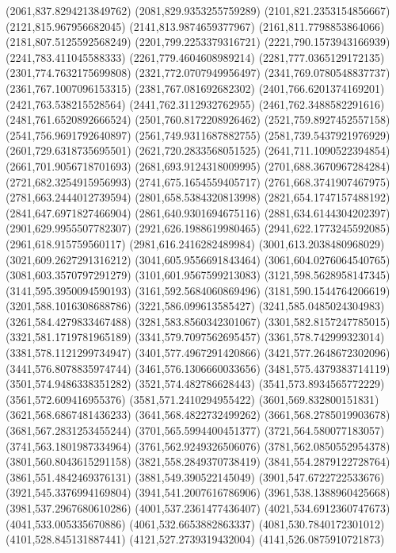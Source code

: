 {(2061,837.8294213849762)
(2081,829.9353255759289)
(2101,821.2353154856667)
(2121,815.967956682045)
(2141,813.9874659377967)
(2161,811.7798853864066)
(2181,807.5125592568249)
(2201,799.2253379316721)
(2221,790.1573943166939)
(2241,783.411045588333)
(2261,779.4604608989214)
(2281,777.0365129172135)
(2301,774.7632175699808)
(2321,772.0707949956497)
(2341,769.0780548837737)
(2361,767.1007096153315)
(2381,767.081692682302)
(2401,766.6201374169201)
(2421,763.538215528564)
(2441,762.3112932762955)
(2461,762.3488582291616)
(2481,761.6520892666524)
(2501,760.8172208926462)
(2521,759.8927452557158)
(2541,756.9691792640897)
(2561,749.9311687882755)
(2581,739.5437921976929)
(2601,729.6318735695501)
(2621,720.2833568051525)
(2641,711.1090522394854)
(2661,701.9056718701693)
(2681,693.9124318009995)
(2701,688.3670967284284)
(2721,682.3254915956993)
(2741,675.1654559405717)
(2761,668.3741907467975)
(2781,663.2444012739594)
(2801,658.5384320813998)
(2821,654.1747157488192)
(2841,647.6971827466904)
(2861,640.9301694675116)
(2881,634.6144304202397)
(2901,629.9955507782307)
(2921,626.1988619980465)
(2941,622.1773245592085)
(2961,618.915759560117)
(2981,616.2416282489984)
(3001,613.2038480968029)
(3021,609.2627291316212)
(3041,605.9556691843464)
(3061,604.0276064540765)
(3081,603.3570797291279)
(3101,601.9567599213083)
(3121,598.5628958147345)
(3141,595.3950094590193)
(3161,592.5684060869496)
(3181,590.1544764206619)
(3201,588.1016308688786)
(3221,586.099613585427)
(3241,585.0485024304983)
(3261,584.4279833467488)
(3281,583.8560342301067)
(3301,582.8157247785015)
(3321,581.1719781965189)
(3341,579.7097562695457)
(3361,578.742999323014)
(3381,578.1121299734947)
(3401,577.4967291420866)
(3421,577.2648672302096)
(3441,576.8078835974744)
(3461,576.1306660033656)
(3481,575.4379383714119)
(3501,574.9486338351282)
(3521,574.482786628443)
(3541,573.8934565772229)
(3561,572.609416955376)
(3581,571.2410294955422)
(3601,569.832800151831)
(3621,568.6867481436233)
(3641,568.4822732499262)
(3661,568.2785019903678)
(3681,567.2831253455244)
(3701,565.5994400451377)
(3721,564.580077183057)
(3741,563.1801987334964)
(3761,562.9249326506076)
(3781,562.0850552954378)
(3801,560.8043615291158)
(3821,558.2849370738419)
(3841,554.2879122728764)
(3861,551.4842469376131)
(3881,549.390522145049)
(3901,547.6722722533676)
(3921,545.3376994169804)
(3941,541.2007616786906)
(3961,538.1388960425668)
(3981,537.2967680610286)
(4001,537.2361477436407)
(4021,534.6912360747673)
(4041,533.005335670886)
(4061,532.6653882863337)
(4081,530.7840172301012)
(4101,528.845131887441)
(4121,527.2739319432004)
(4141,526.0875910721873)
}
